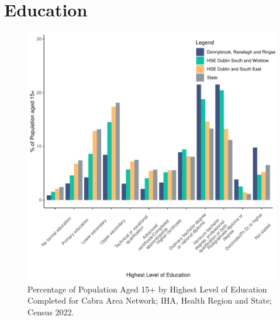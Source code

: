 \documentclass{article}
\begin{document}
\section{Education}\label{sect:Edu}
\begin{figure}[H]
	\centering
	\includegraphics[width = 120mm]{../figures/EduED.pdf}
	\caption{Percentage of Population Aged 15+ by Highest Level of Education Completed for Cabra Area Network; IHA, Health Region and State; Census 2022.}
	\label{fig:vbnv}
	\end{figure}
\end{document}
